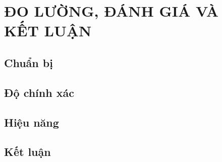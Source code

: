 \chapter{ĐO LƯỜNG, ĐÁNH GIÁ VÀ KẾT LUẬN}

\section{Chuẩn bị}
\section{Độ chính xác}
\section{Hiệu năng}
\section{Kết luận}